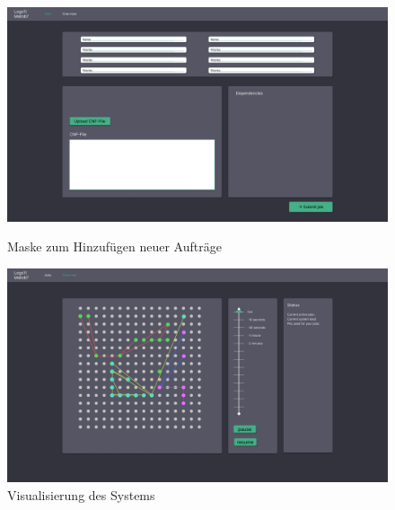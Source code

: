\begin{figure}[h]
    \centering
    \includegraphics[width=\textwidth]{images-interface/Submit-Filev1.png}
    \caption{Maske zum Hinzufügen neuer Aufträge}
    \label{fig:addjobs}
     \includegraphics[width=\textwidth]{images-interface/overviewv1.png}
    \caption{Visualisierung des Systems}
    \label{fig:visualsn}
\end{figure}


